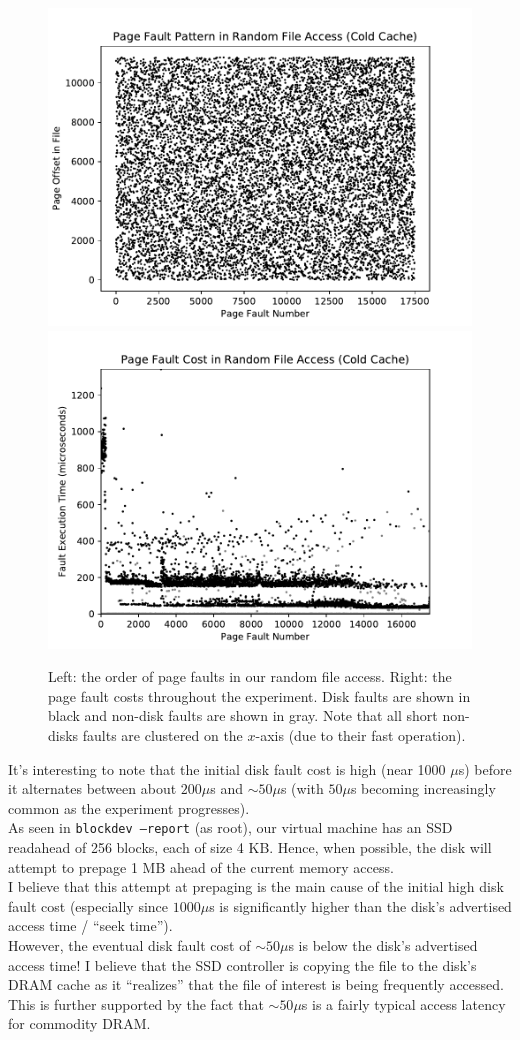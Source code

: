 \documentclass{article}
\begin{document}
	\begin{figure}[ht!]
		\centering
		\includegraphics[width=0.45\linewidth, trim=0.4cm 0.4cm 0.4cm 0.4cm]{figures/random1.pdf}
		\includegraphics[width=0.45\linewidth, trim=0.4cm 0.4cm 0.4cm 0.4cm]{figures/random2.pdf}
		\caption{Left: the order of page faults in our random file access. Right: the page fault costs throughout the experiment. Disk faults are shown in black and non-disk faults are shown in gray. Note that all short non-disks faults are clustered on the $x$-axis (due to their fast operation).}
	\end{figure}
	
	It's interesting to note that the initial disk fault cost is high (near 1000 $\mu$s) before it alternates between about $200 \mu$s and $\sim$$50\mu$s (with $50\mu$s becoming increasingly common as the experiment progresses).\\
	
	As seen in \texttt{blockdev --report} (as root), our virtual machine has an SSD readahead of 256 blocks, each of size 4 KB. Hence, when possible, the disk will attempt to prepage 1 MB ahead of the current memory access.\\
	
	I believe that this attempt at prepaging is the main cause of the initial high disk fault cost (especially since $1000\mu$s is significantly higher than the disk's advertised access time / ``seek time'').\\
	
	However, the eventual disk fault cost of $\sim$$50 \mu$s is below the disk's advertised access time! I believe that the SSD controller is copying the file to the disk's DRAM cache as it ``realizes'' that the file of interest is being frequently accessed. This is further supported by the fact that $\sim$$50 \mu$s is a fairly typical access latency for commodity DRAM.\\
	
\end{document}
